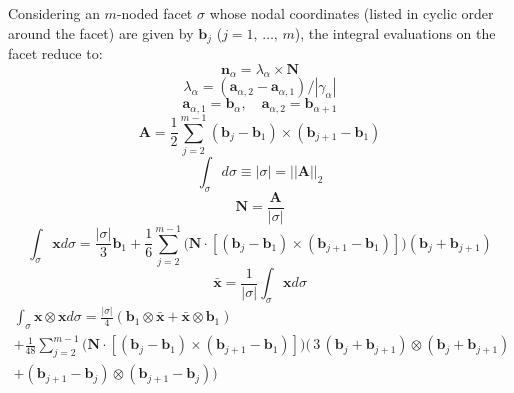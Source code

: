 \documentclass[11pt]{article} %
\begin{document}
Considering an $m$-noded facet $\sigma$ whose nodal coordinates (listed in cyclic order around the facet) are given by $\mathbf{b}_j$ ($j = 1, \, \ldots, \, m$), the integral evaluations on the facet reduce to:
\begin{equation}
	\mathbf{n}_\alpha = \lambda_\alpha \times \mathbf{N}
\end{equation}
\begin{equation}
	\lambda_\alpha = (\mathbf{a}_{\alpha,2} - \mathbf{a}_{\alpha,1})/|\gamma_\alpha|
\end{equation}
\begin{equation}
	\mathbf{a}_{\alpha,1} = \mathbf{b}_{\alpha}, \quad \mathbf{a}_{\alpha,2} = \mathbf{b}_{\alpha+1}
\end{equation}
\begin{equation}
	\mathbf{A} = \frac{1}{2} \sum_{j = 2}^{m-1} (\mathbf{b}_{j} - \mathbf{b}_1) \times (\mathbf{b}_{j+1} - \mathbf{b}_{1})
\end{equation}
\begin{equation}
	\int_{\sigma} d \sigma \equiv | \sigma | = || \mathbf{A} ||_2
\end{equation}
\begin{equation}
	\mathbf{N} = \frac{\mathbf{A}}{| \sigma |}
\end{equation}
\begin{equation}
	\int_{\sigma} \mathbf{x} d \sigma = \frac{| \sigma |}{3} \mathbf{b}_1 + \frac{1}{6} \sum_{j = 2}^{m-1} \bigg( \mathbf{N} \cdot \left[ (\mathbf{b}_{j} - \mathbf{b}_1) \times (\mathbf{b}_{j+1} - \mathbf{b}_{1}) \right] \bigg) (\mathbf{b}_{j} + \mathbf{b}_{j+1})
\end{equation}
\begin{equation}
	\bar{\mathbf{x}} = \frac{1}{| \sigma |} \int_{\sigma} \mathbf{x} d \sigma
\end{equation}
\begin{eqnarray}
	\int_{\sigma} \mathbf{x} \otimes \mathbf{x} d \sigma = \frac{| \sigma |}{4} ( \mathbf{b}_1 \otimes \bar{\mathbf{x}} + \bar{\mathbf{x}} \otimes \mathbf{b}_1 ) \nonumber \\ + \frac{1}{48} \sum_{j = 2}^{m-1} \bigg( \mathbf{N} \cdot \left[ (\mathbf{b}_{j} - \mathbf{b}_1) \times (\mathbf{b}_{j+1} - \mathbf{b}_{1}) \right] \bigg) \bigg( \, 3 \, (\mathbf{b}_{j} + \mathbf{b}_{j+1}) \otimes (\mathbf{b}_{j} + \mathbf{b}_{j+1}) \nonumber \\ + (\mathbf{b}_{j+1} - \mathbf{b}_{j}) \otimes (\mathbf{b}_{j+1} - \mathbf{b}_{j}) \bigg)
\end{eqnarray}
\end{document}
